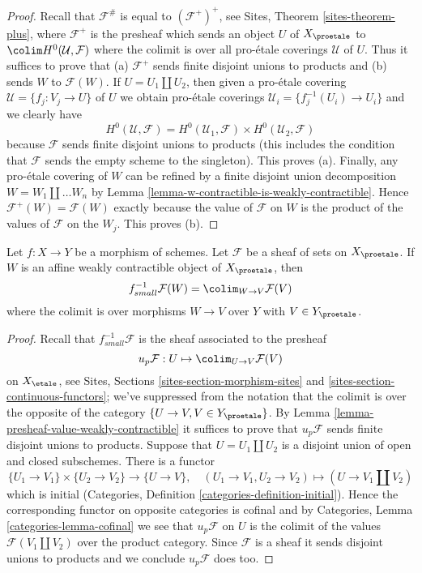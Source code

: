 \begin{proof}
Recall that $\mathcal{F}^\#$ is equal to $(\mathcal{F}^+)^+$, see
Sites, Theorem \ref{sites-theorem-plus}, where $\mathcal{F}^+$
is the presheaf which sends an object $U$ of $X_\proetale$ to
$\colim H^0(\mathcal{U}, \mathcal{F})$ where the colimit is
over all pro-\'etale coverings $\mathcal{U}$ of $U$.
Thus it suffices to prove that (a) $\mathcal{F}^+$ sends finite
disjoint unions to products and (b) sends $W$ to $\mathcal{F}(W)$.
If $U = U_1 \amalg U_2$, then given a pro-\'etale covering
$\mathcal{U} = \{f_j : V_j \to U\}$ of $U$ we obtain pro-\'etale coverings
$\mathcal{U}_i = \{f_j^{-1}(U_i) \to U_i\}$ and we clearly have
$$
H^0(\mathcal{U}, \mathcal{F}) =
H^0(\mathcal{U}_1, \mathcal{F}) \times
H^0(\mathcal{U}_2, \mathcal{F})
$$
because $\mathcal{F}$ sends finite disjoint unions to products (this includes
the condition that $\mathcal{F}$ sends the empty scheme to the singleton).
This proves (a).
Finally, any pro-\'etale covering of $W$ can be refined by a finite disjoint
union decomposition $W = W_1 \amalg \ldots W_n$ by
Lemma \ref{lemma-w-contractible-is-weakly-contractible}.
Hence $\mathcal{F}^+(W) = \mathcal{F}(W)$ exactly because the value of
$\mathcal{F}$ on $W$ is the product of the values of $\mathcal{F}$
on the $W_j$. This proves (b).
\end{proof}

\begin{lemma}
\label{lemma-small-pullback-weakly-contractible}
Let $f : X \to Y$ be a morphism of schemes. Let $\mathcal{F}$ be a sheaf
of sets on $X_\proetale$. If $W$ is an affine weakly contractible
object of $X_\proetale$, then
$$
f_{small}^{-1}\mathcal{F}(W) = \colim_{W \to V} \mathcal{F}(V)
$$
where the colimit is over morphisms $W \to V$ over $Y$
with $V \in Y_\proetale$.
\end{lemma}

\begin{proof}
Recall that $f_{small}^{-1}\mathcal{F}$ is the sheaf associated to the
presheaf
$$
u_p\mathcal{F} : U \mapsto \colim_{U \to V} \mathcal{F}(V)
$$
on $X_\etale$, see Sites, Sections \ref{sites-section-morphism-sites} and
\ref{sites-section-continuous-functors}; we've suppressed from the notation
that the colimit is over the opposite of the category
$\{U \to V, V \in Y_\proetale\}$. By
Lemma \ref{lemma-presheaf-value-weakly-contractible}
it suffices to prove that $u_p\mathcal{F}$ sends finite disjoint unions
to products.
Suppose that $U = U_1 \amalg U_2$ is a disjoint union of open and closed
subschemes. There is a functor
$$
\{U_1 \to V_1\} \times \{U_2 \to V_2\} \longrightarrow
\{U \to V\},\quad
(U_1 \to V_1, U_2 \to V_2) \longmapsto (U \to V_1 \amalg V_2)
$$
which is initial (Categories, Definition \ref{categories-definition-initial}).
Hence the corresponding functor on opposite categories is cofinal and
by Categories, Lemma \ref{categories-lemma-cofinal} we see
that $u_p\mathcal{F}$ on $U$ is the colimit of the values
$\mathcal{F}(V_1 \amalg V_2)$ over the product category.
Since $\mathcal{F}$ is a sheaf it sends disjoint unions to products and
we conclude $u_p\mathcal{F}$ does too.
\end{proof}

